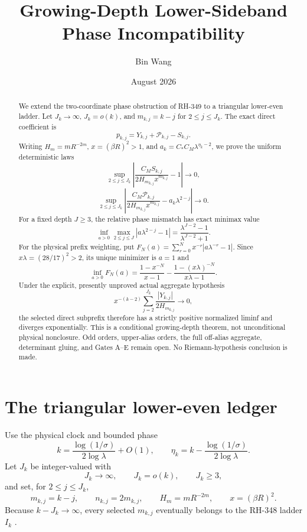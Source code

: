 \documentclass[11pt]{article}
\title{Growing-Depth Lower-Sideband Phase Incompatibility}
\author{Bin Wang}
\date{August 2026}
\theoremstyle{remark}
\newcommand{\cP}{\mathcal P}
\begin{document}
\maketitle

\begin{abstract}
We extend the two-coordinate phase obstruction of RH-349 to a triangular
lower-even ladder.  Let $J_k\to\infty$, $J_k=o(k)$, and
$m_{k,j}=k-j$ for $2\le j\le J_k$.  The exact direct coefficient is
\[
 p_{k,j}=Y_{k,j}+\cP_{k,j}-S_{k,j}.
\]
Writing $H_m=mR^{-2m}$, $x=(\beta R)^2>1$, and
$a_k=C_*C_M\lambda^{\eta_k-2}$, we prove the uniform deterministic laws
\[
 \sup_{2\le j\le J_k}
 \left|\frac{C_MS_{k,j}}{2H_{m_{k,j}}x^{m_{k,j}}}-1\right|\to0,
\]
\[
 \sup_{2\le j\le J_k}
 \left|\frac{C_M\cP_{k,j}}{2H_{m_{k,j}}x^{m_{k,j}}}
       -a_k\lambda^{2-j}\right|\to0.
\]
For a fixed depth $J\ge3$, the relative phase mismatch has exact minimax
value
\[
 \inf_{a>0}\max_{2\le j\le J}|a\lambda^{2-j}-1|
 =\frac{\lambda^{J-2}-1}{\lambda^{J-2}+1}.
\]
For the physical prefix weighting, put
$F_N(a)=\sum_{r=0}^{N}x^{-r}|a\lambda^{-r}-1|$.  Since
$x\lambda=(28/17)^2>2$, its unique minimizer is $a=1$ and
\[
 \inf_{a>0}F_N(a)
 =\frac{1-x^{-N}}{x-1}
  -\frac{1-(x\lambda)^{-N}}{x\lambda-1}.
\]
Under the explicit, presently unproved actual aggregate hypothesis
\[
 x^{-(k-2)}\sum_{j=2}^{J_k}
 \frac{|Y_{k,j}|}{2H_{m_{k,j}}}\to0,
\]
the selected direct subprefix therefore has a strictly positive normalized
liminf and diverges exponentially.  This is a conditional growing-depth
theorem, not unconditional physical nonclosure.  Odd orders, upper-alias
orders, the full off-alias aggregate, determinant gluing, and Gates A--E
remain open.  No Riemann-hypothesis conclusion is made.
\end{abstract}

\section{The triangular lower-even ledger}

Use the physical clock and bounded phase
\begin{equation}\label{eq:clock}
 k=\frac{\log(1/\sigma)}{2\log\lambda}+O(1),\qquad
 \eta_k=k-\frac{\log(1/\sigma)}{2\log\lambda}.
\end{equation}
Let $J_k$ be integer-valued with
\begin{equation}\label{eq:depth}
 J_k\longrightarrow\infty,\qquad J_k=o(k),\qquad J_k\ge3,
\end{equation}
and set, for $2\le j\le J_k$,
\begin{equation}\label{eq:indices}
 m_{k,j}=k-j,\qquad n_{k,j}=2m_{k,j},\qquad
 H_m=mR^{-2m},\qquad x=(\beta R)^2.
\end{equation}
Because $k-J_k\to\infty$, every selected $m_{k,j}$ eventually belongs to
the RH-348 ladder $I_k$ \citep{WangLowerLadder2026}.
\end{document}
